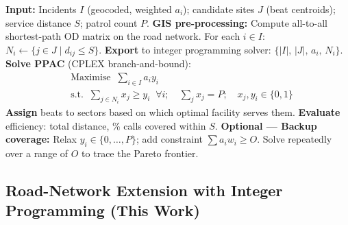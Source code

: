 \documentclass[12pt]{article}
\begin{document}
\begin{algorithm}[H]
\caption{Classical PPAC --- Maximal Covering for Police Patrol Areas}
\begin{algorithmic}[1]
\State \textbf{Input:} Incidents $I$ (geocoded, weighted $a_i$); candidate sites $J$
       (beat centroids); service distance $S$; patrol count $P$.
\State \textbf{GIS pre-processing:}
    \Statex \quad Compute all-to-all shortest-path OD matrix on the road network.
    \Statex \quad For each $i \in I$: $N_i \leftarrow \{j \in J \mid d_{ij} \le S\}$.
\State \textbf{Export} to integer programming solver:
       $\{|I|,\, |J|,\, a_i,\, N_i\}$.
\State \textbf{Solve PPAC} (CPLEX branch-and-bound):
    \begin{align*}
        &\text{Maximise}\;\; \textstyle\sum_{i \in I} a_i y_i\\
        &\text{s.t.}\;\;
            \textstyle\sum_{j \in N_i} x_j \ge y_i \;\; \forall i;\quad
            \textstyle\sum_j x_j = P;\quad
            x_j, y_i \in \{0,1\}
    \end{align*}
\State \textbf{Assign} beats to sectors based on which optimal facility serves them.
\State \textbf{Evaluate} efficiency: total distance, \% calls covered within $S$.
\State \textbf{Optional --- Backup coverage:}
    \Statex \quad Relax $y_i \in \{0,\dots,P\}$; add constraint $\sum a_i w_i \ge O$.
    \Statex \quad Solve repeatedly over a range of $O$ to trace the Pareto frontier.
\end{algorithmic}
\end{algorithm}

\subsection{Road-Network Extension with Integer Programming (This Work)}
\end{document}
